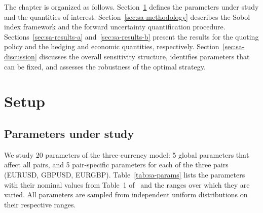 The chapter is organized as follows. Section~\ref{sec:sa-setup} defines the parameters under study and the quantities of interest. Section~\ref{sec:sa-methodology} describes the Sobol index framework and the forward uncertainty quantification procedure. Sections~\ref{sec:sa-results-a} and~\ref{sec:sa-results-b} present the results for the quoting policy and the hedging and economic quantities, respectively. Section~\ref{sec:sa-discussion} discusses the overall sensitivity structure, identifies parameters that can be fixed, and assesses the robustness of the optimal strategy.


\section{Setup}
\label{sec:sa-setup}

\subsection{Parameters under study}
\label{sec:sa-params}

We study 20 parameters of the three-currency model: 5 global parameters that affect all pairs, and 5 pair-specific parameters for each of the three pairs (EURUSD, GBPUSD, EURGBP). Table~\ref{tab:sa-params} lists the parameters with their nominal values from Table~1 of~\cite{barzykin2023} and the ranges over which they are varied. All parameters are sampled from independent uniform distributions on their respective ranges.

